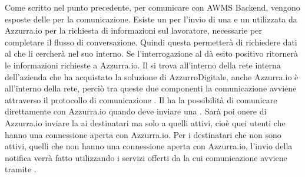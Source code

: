 \begin{trivlist}
	Come scritto nel punto precedente, per comunicare con AWMS Backend, vengono esposte delle  per la comunicazione. Esiste un  per l'invio di una  e un  utilizzata da Azzurra.io per la richiesta di informazioni sul lavoratore, necessarie per completare il flusso di conversazione. Quindi questa  permetterà di richiedere dati al  che li cercherà nel suo  interno. Se l'interrogazione al  dà esito positivo ritornerà le informazioni richieste a Azzurra.io. Il  si trova all'interno della rete interna dell'azienda che ha acquistato la soluzione di AzzurroDigitale, anche Azzurra.io è all'interno della rete, perciò tra queste due componenti la comunicazione avviene attraverso il protocollo di comunicazione . Il  ha la possibilità di comunicare direttamente con Azzurra.io quando deve inviare una . Sarà poi onere di Azzurra.io inviare la  ai destinatari ma solo a quelli attivi, cioè quei utenti che hanno una connessione aperta con Azzurra.io. Per i destinatari che non sono attivi, quelli che non hanno una connessione aperta con Azzurra.io, l'invio della notifica verrà fatto utilizzando i servizi offerti da  la cui comunicazione avviene tramite .\\
	

\end{trivlist}
